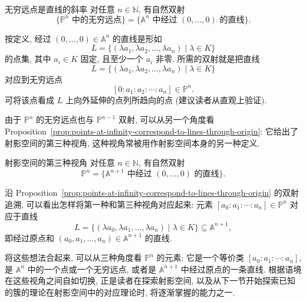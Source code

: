 \begin{Proposition}{无穷远点是直线的斜率}\leavevmode\label{prop:points-at-infinity-correspond-to-lines-through-origin}
对任意 $n\in\mathbb{N}$, 有自然双射
\[
  \{\mathbb{P}^{n}\text{ 中的无穷远点}\}
    =\{\mathbb{A}^{n}\text{ 中经过 }(0,\ldots,0)\text{ 的直线}\}.
\]
\end{Proposition}
\begin{Proof}
按定义, 经过 $(0,\ldots,0)\in\mathbb{A}^{n}$ 的直线是形如
\[
  L=\{(\lambda a_{1},\lambda a_{2},\ldots,\lambda a_{n})\mid\lambda\in K\}
\]
的点集, 其中 $a_{i}\in K$ 固定, 且至少一个 $a_{i}$ 非零. 所需的双射就是把直线
\[
  L=\{(\lambda a_{1},\lambda a_{2},\ldots,\lambda a_{n})\mid\lambda\in K\}
\]
对应到无穷远点
\[
  [0:a_{1}:a_{2}:\cdots:a_{n}]\in\mathbb{P}^{n}.
\]
可将该点看成 $L$ 上向外延伸的点列所趋向的点 (建议读者从直观上验证).
\end{Proof}

由于 $\mathbb{P}^{n}$ 的无穷远点也与 $\mathbb{P}^{n-1}$ 双射, 可以从另一个角度看 Proposition~\ref{prop:points-at-infinity-correspond-to-lines-through-origin}: 它给出了射影空间的第三种视角, 这种视角常被用作射影空间本身的另一种定义.

\begin{Corollary}{射影空间的第三种视角}\leavevmode\label{cor:projective-space-as-lines-through-origin}
对任意 $n\in\mathbb{N}$, 有自然双射
\[
  \mathbb{P}^{n}=\{\mathbb{A}^{n+1}\text{ 中经过 }(0,\ldots,0)\text{ 的直线}\}.
\]
\end{Corollary}

沿 Proposition~\ref{prop:points-at-infinity-correspond-to-lines-through-origin} 的双射追溯, 可以看出怎样将第一种和第三种视角对应起来: 元素 $[a_{0}:a_{1}:\cdots:a_{n}]\in\mathbb{P}^{n}$ 对应于直线
\[
  L=\{(\lambda a_{0},\lambda a_{1},\ldots,\lambda a_{n})\mid\lambda\in K\}\subseteq\mathbb{A}^{n+1},
\]
即经过原点和 $(a_{0},a_{1},\ldots,a_{n})\in\mathbb{A}^{n+1}$ 的直线.

将这些想法合起来, 可以从三种角度看 $\mathbb{P}^{n}$ 的元素: 它是一个等价类 $[a_{0}:a_{1}:\cdots:a_{n}]$, 是 $\mathbb{A}^{n}$ 中的一个点或一个无穷远点, 或者是 $\mathbb{A}^{n+1}$ 中经过原点的一条直线. 根据语境在这些视角之间自如切换, 正是读者在探索射影空间, 以及从下一节开始探索已知的簇的理论在射影空间中的对应理论时, 将逐渐掌握的能力之一.

